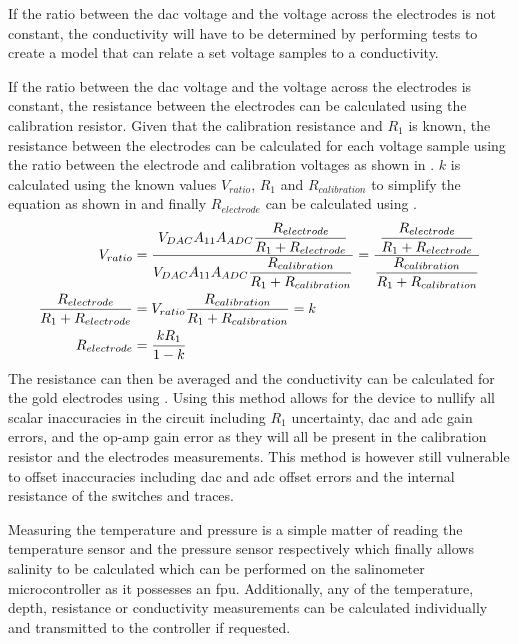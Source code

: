 If the ratio between the \gls{dac} voltage and the voltage across the electrodes is not constant, the conductivity will have to be determined by performing tests to create a model that can relate a set voltage samples to a conductivity. 

If the ratio between the \gls{dac} voltage and the voltage across the electrodes is constant, the resistance between the electrodes can be calculated using the calibration resistor.
Given that the calibration resistance and $R_1$ is known, the resistance between the electrodes can be calculated for each voltage sample using the ratio between the electrode and calibration voltages as shown in .
$k$ is calculated using the known values $V_{ratio}$, $R_1$ and $R_{calibration}$ to simplify the equation as shown in  and finally $R_{electrode}$ can be calculated using .
\begin{align}
    V_{ratio} &= \frac{\displaystyle V_{DAC}A_{11}A_{ADC}\frac{\displaystyle R_{electrode}}{\displaystyle R_1 + R_{electrode}}}{\displaystyle V_{DAC}A_{11}A_{ADC}\frac{\displaystyle R_{calibration}}{\displaystyle R_1 + R_{calibration}}} = \frac{\displaystyle \frac{\displaystyle R_{electrode}}{\displaystyle R_1 + R_{electrode}}}{\displaystyle \frac{\displaystyle R_{calibration}}{\displaystyle R_1 + R_{calibration}}} \label{eqn:electrode-calib-resistance} \\
    \frac{\displaystyle R_{electrode}}{\displaystyle R_1 + R_{electrode}} &= V_{ratio} \frac{\displaystyle R_{calibration}}{\displaystyle R_1 + R_{calibration}} = k \label{eqn:electrode-calib-resistance-simplified} \\
    R_{electrode} &= \frac{\displaystyle kR_1}{\displaystyle 1 - k} \label{eqn:electrode-calib-resistance-final}
\end{align}
The resistance can then be averaged and the conductivity can be calculated for the gold electrodes using .
Using this method allows for the device to nullify all scalar inaccuracies in the circuit including $R_1$ uncertainty, \gls{dac} and \gls{adc} gain errors, and the op-amp gain error as they will all be present in the calibration resistor and the electrodes measurements.
This method is however still vulnerable to offset inaccuracies including \gls{dac} and \gls{adc} offset errors and the internal resistance of the switches and traces.

Measuring the temperature and pressure is a simple matter of reading the temperature sensor and the pressure sensor respectively which finally allows salinity to be calculated which can be performed on the salinometer microcontroller as it possesses an \gls{fpu}.
Additionally, any of the temperature, depth, resistance or conductivity measurements can be calculated individually and transmitted to the controller if requested.

